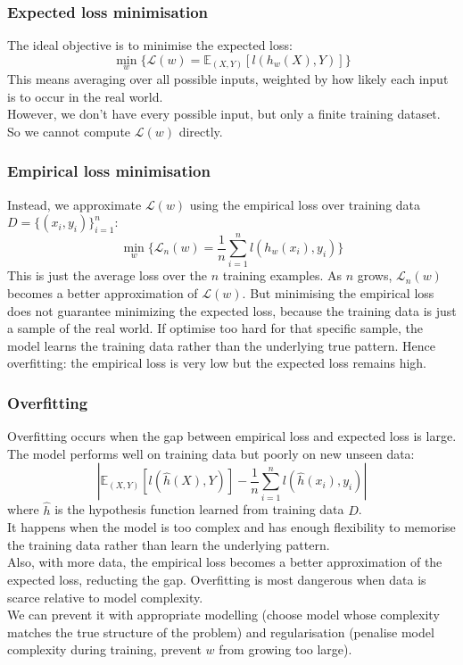 \documentclass[../Probability.tex]{subfiles}
\begin{document}
\subsubsection{Expected loss minimisation}
The ideal objective is to minimise the expected loss:
$$\min_w \{\mathcal{L}(w) = \mathbb{E}_{(X,Y)}[l(h_w(X), Y)]\}$$
This means averaging over all possible inputs, weighted by how likely each input is to occur in the real world.\\
However, we don't have every possible input, but only a finite training dataset. So we cannot compute $\mathcal{L}(w)$ directly.\\

\subsubsection{Empirical loss minimisation}
Instead, we approximate $\mathcal{L}(w)$ using the empirical loss over training data $D = \{(x_i, y_i)\}^{n}_{i=1}$:
$$\min_w \{\mathcal{L}_n(w) = \frac{1}{n} \sum_{i=1}^{n} l(h_w(x_i), y_i)\}$$
This is just the average loss over the $n$ training examples.
As $n$ grows, $\mathcal{L}_n(w)$ becomes a better approximation of $\mathcal{L}(w)$.
But minimising the empirical loss does not guarantee minimizing the expected loss, because the training data is just a sample of the real world.
If optimise too hard for that specific sample, the model learns the training data rather than the underlying true pattern. Hence overfitting: the empirical loss is very low but the expected loss remains high.

\subsubsection{Overfitting}
Overfitting occurs when the gap between empirical loss and expected loss is large. The model performs well on training data but poorly on new unseen data:
$$\left| \mathbb{E}_{(X,Y)}[l(\hat{h}(X), Y)] - \frac{1}{n}\sum_{i=1}^{n} l(\hat{h}(x_i), y_i) \right|$$
where $\hat{h}$ is the hypothesis function learned from training data $D$.\\
It happens when the model is too complex and has enough flexibility to memorise the training data rather than learn the underlying pattern.\\
Also, with more data, the empirical loss becomes a better approximation of the expected loss, reducting the gap. Overfitting is most dangerous when data is scarce relative to model complexity.\\
We can prevent it with appropriate modelling (choose model whose complexity matches the true structure of the problem) and regularisation (penalise model complexity during training, prevent $w$ from growing too large).
\end{document}

